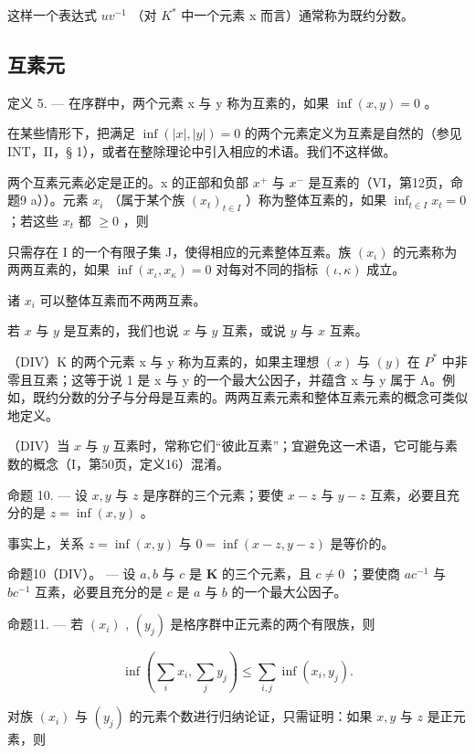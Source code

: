 这样一个表达式 \(uv^{-1}\) （对 \(K^{*}\) 中一个元素 x 而言）通常称为既约分数。

\subsection{互素元}

定义 5. --- 在序群中，两个元素 x 与 y 称为互素的，如果 \(\inf(x, y) = 0\) 。

在某些情形下，把满足 \(\inf(|x|, |y|) = 0\) 的两个元素定义为互素是自然的（参见 INT，II，§ 1），或者在整除理论中引入相应的术语。我们不这样做。

两个互素元素必定是正的。x 的正部和负部 \(x^{+}\) 与 \(x^{-}\) 是互素的（VI，第12页，命题9 a））。元素 \(x_{i}\) （属于某个族 \((x_{t})_{t\in I}\) ）称为整体互素的，如果 \(\inf_{t\in I}x_t = 0\) ；若这些 \(x_{t}\) 都 \(\geqslant 0\) ，则

只需存在 I 的一个有限子集 J，使得相应的元素整体互素。族 \((x_{\iota})\) 的元素称为两两互素的，如果 \(\inf(x_{\iota}, x_{\kappa}) = 0\) 对每对不同的指标 \((\iota, \kappa)\) 成立。

诸 \(x_{i}\) 可以整体互素而不两两互素。

若 \(x\) 与 \(y\) 是互素的，我们也说 \(x\) 与 \(y\) 互素，或说 \(y\) 与 \(x\) 互素。

（DIV）K 的两个元素 x 与 y 称为互素的，如果主理想 \((x)\) 与 \((y)\) 在 \(P^{*}\) 中非零且互素；这等于说 1 是 x 与 y 的一个最大公因子，并蕴含 x 与 y 属于 A。例如，既约分数的分子与分母是互素的。两两互素元素和整体互素元素的概念可类似地定义。

（DIV）当 \(x\) 与 \(y\) 互素时，常称它们“彼此互素”；宜避免这一术语，它可能与素数的概念（I，第50页，定义16）混淆。

命题 10. --- 设 \(x, y\) 与 \(z\) 是序群的三个元素；要使 \(x - z\) 与 \(y - z\) 互素，必要且充分的是 \(z = \inf(x, y)\) 。

事实上，关系 \(z = \inf (x, y)\) 与 \(0 = \inf (x - z, y - z)\) 是等价的。

命题10（DIV）。 --- 设 \(a, b\) 与 \(c\) 是 \(\mathbf{K}\) 的三个元素，且 \(c \neq 0\) ；要使商 \(ac^{-1}\) 与 \(bc^{-1}\) 互素，必要且充分的是 \(c\) 是 \(a\) 与 \(b\) 的一个最大公因子。

命题11. --- 若 \((x_{i})\) , \((y_{j})\) 是格序群中正元素的两个有限族，则

\[
\inf \left(\sum_ {i} x _ {i}, \sum_ {j} y _ {j}\right) \leqslant \sum_ {i, j} \inf (x _ {i}, y _ {j}).
\]

对族 \((x_{i})\) 与 \((y_{j})\) 的元素个数进行归纳论证，只需证明：如果 \(x, y\) 与 \(z\) 是正元素，则

